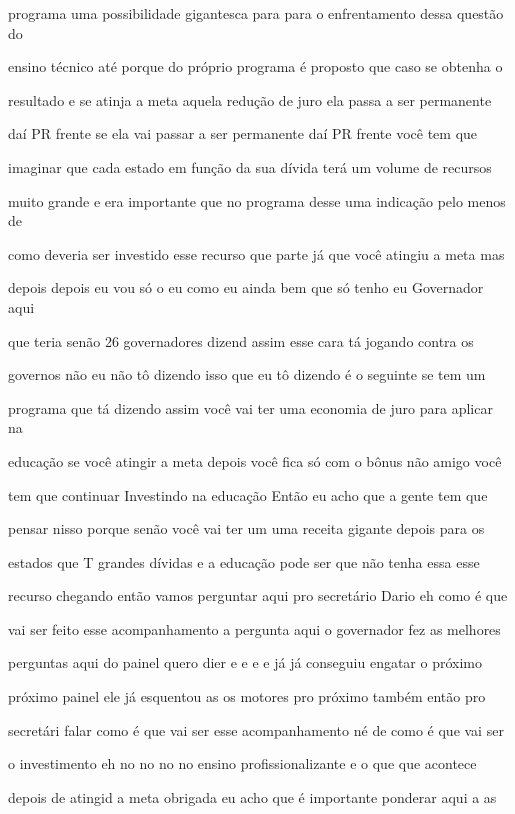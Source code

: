 \documentclass[a4paper,12pt]{article}
\begin{document}
programa uma possibilidade gigantesca para para o enfrentamento dessa questão do

ensino técnico até porque do próprio programa é proposto que caso se obtenha o

resultado e se atinja a meta aquela redução de juro ela passa a ser permanente

daí PR frente se ela vai passar a ser permanente daí PR frente você tem que

imaginar que cada estado em função da sua dívida terá um volume de recursos

muito grande e era importante que no programa desse uma indicação pelo menos de

como deveria ser investido esse recurso que parte já que você atingiu a meta mas

depois depois eu vou só o eu como eu ainda bem que só tenho eu Governador aqui

que teria senão 26 governadores dizend assim esse cara tá jogando contra os

governos não eu não tô dizendo isso que eu tô dizendo é o seguinte se tem um

programa que tá dizendo assim você vai ter uma economia de juro para aplicar na

educação se você atingir a meta depois você fica só com o bônus não amigo você

tem que continuar Investindo na educação Então eu acho que a gente tem que

pensar nisso porque senão você vai ter um uma receita gigante depois para os

estados que T grandes dívidas e a educação pode ser que não tenha essa esse

recurso chegando então vamos perguntar aqui pro secretário Dario eh como é que

vai ser feito esse acompanhamento a pergunta aqui o governador fez as melhores

perguntas aqui do painel quero dier e e e e já já conseguiu engatar o próximo

próximo painel ele já esquentou as os motores pro próximo também então pro

secretári falar como é que vai ser esse acompanhamento né de como é que vai ser

o investimento eh no no no no ensino profissionalizante e o que que acontece

depois de atingid a meta obrigada eu acho que é importante ponderar aqui a as
\end{document}
